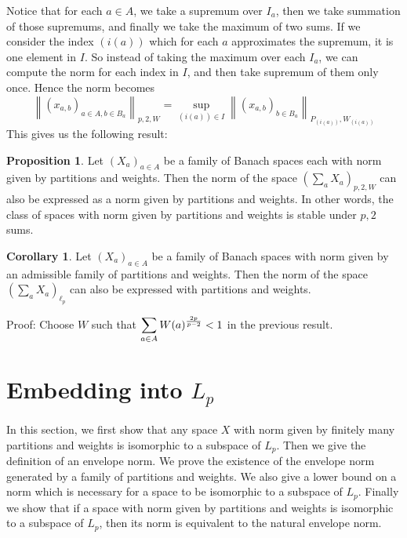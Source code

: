 \documentclass[12pt]{amsart}
\theoremstyle{definition}
\newtheorem{corollary}[theorem]{Corollary}
\newtheorem{proposition}[theorem]{Proposition}
\theoremstyle{remark}
\numberwithin{equation}{section}
\begin{document}
Notice that for each $a\in A$, we take a supremum over $I_a$,
then we take summation of those supremums, and finally we take the
maximum of two sums. If we consider the index $(i(a))$ which for each
$a$ approximates the supremum, it is one element in $I$. So instead
of taking the maximum over each $I_a$, we can compute the norm for
each index in
$I$, and then take supremum of them only once. Hence the norm becomes
$$ \left\|(x_{a,b})_{a\in A, b\in B_a}\right\|_{p,2,W}=\sup_{(i(a))\in I}
 \left\|(x_{a,b})_{ b\in B_a}\right\|_{P_{(i(a))}, W_{(i(a))}}$$
This gives us the following result:
\begin{proposition}\label{p,2 sum}
Let $(X_a)_{a\in A}$ be a family of Banach spaces each with norm given
 by partitions and weights. Then the norm of the space $(\sum_a
 X_a)_{p,2, W}$ can also be expressed as a norm given by partitions
 and weights. In other words, the class of spaces with norm given by
 partitions and weights is stable under $p,2$ sums.
\end{proposition}

\begin{corollary}
Let $(X_a)_{a\in A}$ be a family of Banach spaces with norm given
 by an admissible family of partitions and weights. Then the norm 
of the space $\left(\sum_a X_a\right)_{\ell_p}$ can also be expressed with
 partitions and weights.
\end{corollary}

Proof: Choose $W$ such that $\begin{displaystyle}\sum_{a\in A} 
W(a)^{\frac{2p}{p-2}} < 1 \end{displaystyle}$ in the previous result.




\section{Embedding into $L_p$}
\label{Embedding into L_p}

In this section, we first show that any space $X$ with norm
given by finitely many partitions and weights is
isomorphic to a subspace of $L_p$.
Then we give the definition of an envelope
norm. We prove the
existence of the envelope norm generated by a family of partitions
and weights. We also give a lower bound on a norm which is necessary
for a space to be isomorphic to a subspace of $L_p$. Finally we show
that if a space with norm given by partitions and weights is
isomorphic to a subspace of $L_p$, then its norm is equivalent to
the natural envelope norm. 
\end{document}
